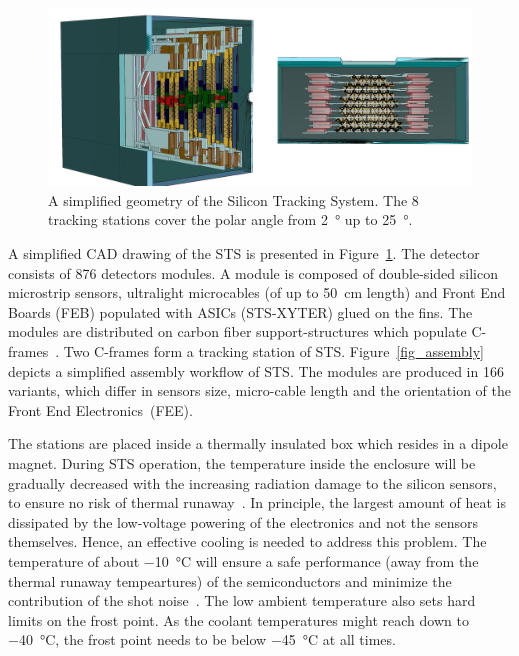 \begin{figure}[!h]
\centering
\includegraphics[width=0.85\columnwidth]{Chapter2/images/STS.png}
\caption{A simplified geometry of the Silicon Tracking System. The 8 tracking stations cover the polar angle from \SI{2}{\degree} up to \SI{25}{\degree}.}
\label{fig_STS}
\end{figure}
A simplified CAD drawing of the \gls{STS} is presented in Figure~\ref{fig_STS}. The detector consists of 876 detectors modules. A module is composed of double-sided silicon microstrip sensors, ultralight microcables (of up to 50~cm length) and Front End Boards (\gls{FEB}) populated with ASICs (STS-XYTER) glued on the fins. The modules are distributed on carbon fiber support-structures which populate C-frames~\cite{progress_report_2016}. Two C-frames form a tracking station of \gls{STS}.  Figure~\ref{fig_assembly} depicts a simplified assembly workflow of \gls{STS}.
The modules are produced in 166 variants, which differ in sensors size, micro-cable length and the orientation of the Front End Electronics~(\gls{FEE}).  


The stations are placed inside a thermally insulated box which resides in a dipole magnet. During \gls{STS} operation, the temperature inside the enclosure will be gradually decreased with the increasing radiation damage to the silicon sensors, to ensure no risk of thermal runaway~\cite{Spieler}. In principle, the largest amount of heat is dissipated by the low-voltage powering of the electronics and not the sensors themselves. Hence, an effective cooling is needed to address this problem.
The temperature of about \SI{-10}{\celsius} will ensure a safe performance (away from the thermal runaway tempeartures) of the semiconductors and minimize the contribution of the shot noise~\cite{Spieler}. The low ambient temperature also sets hard limits on the frost point. As the coolant temperatures might reach down to \SI{-40}{\celsius}, the frost point needs to be below \SI{-45}{\celsius} at all times. 

